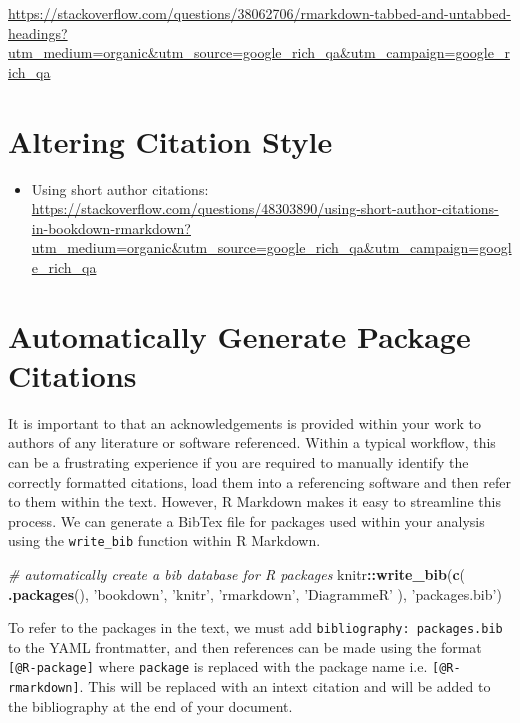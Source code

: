 \documentclass[]{book}
\newenvironment{Shaded}{\begin{snugshade}}{\end{snugshade}}
\newcommand{\KeywordTok}[1]{\textcolor[rgb]{0.13,0.29,0.53}{\textbf{#1}}}
\newcommand{\StringTok}[1]{\textcolor[rgb]{0.31,0.60,0.02}{#1}}
\newcommand{\CommentTok}[1]{\textcolor[rgb]{0.56,0.35,0.01}{\textit{#1}}}
\newcommand{\OperatorTok}[1]{\textcolor[rgb]{0.81,0.36,0.00}{\textbf{#1}}}
\newcommand{\NormalTok}[1]{#1}
\providecommand{\tightlist}{%
  \setlength{\itemsep}{0pt}\setlength{\parskip}{0pt}}
\begin{document}
\url{https://stackoverflow.com/questions/38062706/rmarkdown-tabbed-and-untabbed-headings?utm_medium=organic\&utm_source=google_rich_qa\&utm_campaign=google_rich_qa}

\section{Altering Citation Style}\label{altering-citation-style}

\begin{itemize}
\tightlist
\item
  Using short author citations:
  \url{https://stackoverflow.com/questions/48303890/using-short-author-citations-in-bookdown-rmarkdown?utm_medium=organic\&utm_source=google_rich_qa\&utm_campaign=google_rich_qa}
\end{itemize}

\section{Automatically Generate Package
Citations}\label{automatically-generate-package-citations}

It is important to that an acknowledgements is provided within your work
to authors of any literature or software referenced. Within a typical
workflow, this can be a frustrating experience if you are required to
manually identify the correctly formatted citations, load them into a
referencing software and then refer to them within the text. However, R
Markdown makes it easy to streamline this process. We can generate a
BibTex file for packages used within your analysis using the
\texttt{write\_bib} function within R Markdown.

\begin{Shaded}
\begin{Highlighting}[]
\CommentTok{# automatically create a bib database for R packages}
\NormalTok{knitr}\OperatorTok{::}\KeywordTok{write_bib}\NormalTok{(}\KeywordTok{c}\NormalTok{(}
  \KeywordTok{.packages}\NormalTok{(), }\StringTok{'bookdown'}\NormalTok{, }\StringTok{'knitr'}\NormalTok{, }\StringTok{'rmarkdown'}\NormalTok{, }\StringTok{'DiagrammeR'}
\NormalTok{), }\StringTok{'packages.bib'}\NormalTok{)}
\end{Highlighting}
\end{Shaded}

To refer to the packages in the text, we must add
\texttt{bibliography:\ packages.bib} to the YAML frontmatter, and then
references can be made using the format \texttt{{[}@R-package{]}} where
\texttt{package} is replaced with the package name i.e.
\texttt{{[}@R-rmarkdown{]}}. This will be replaced with an intext
citation and will be added to the bibliography at the end of your
document.
\end{document}
